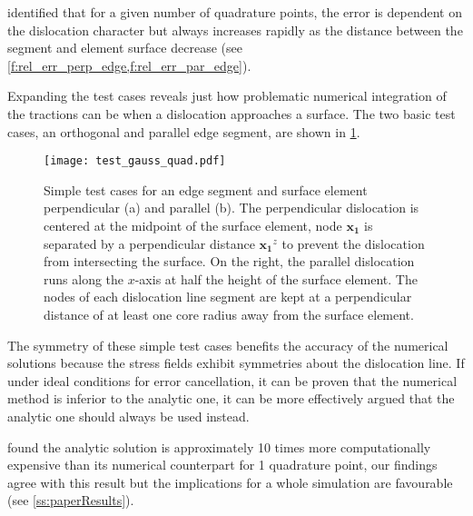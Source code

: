 \citet{analytic_tractions} identified that for a given number of quadrature points, the error is dependent on the dislocation character but always increases rapidly as the distance between the segment and element surface decrease (see \cref{f:rel_err_perp_edge,f:rel_err_par_edge}).

Expanding the test cases reveals just how problematic numerical integration of the tractions can be when a dislocation approaches a surface. The two basic test cases, an orthogonal and parallel edge segment, are shown in \cref{f:gauss_quad_test}.
\begin{figure}
    \centering
    \texttt{[image: test\_gauss\_quad.pdf]}
    \caption[Test cases for comparing numeric v.s. analytic tractions using an edge dislocation near a surface.]{Simple test cases for an edge segment and surface element perpendicular (a) and parallel (b). The perpendicular dislocation is centered at the midpoint of the surface element, node $\mathbf{x_1}$ is separated by a perpendicular distance $\mathbf{x_1}^z$ to prevent the dislocation from intersecting the surface. On the right, the parallel dislocation runs along the $x$-axis at half the height of the surface element. The nodes of each dislocation line segment are kept at a perpendicular distance of at least one core radius away from the surface element.}
    \label{f:gauss_quad_test}
\end{figure}

The symmetry of these simple test cases benefits the accuracy of the numerical solutions because the stress fields exhibit symmetries about the dislocation line. If under ideal conditions for error cancellation, it can be proven that the numerical method is inferior to the analytic one, it can be more effectively argued that the analytic one should always be used instead.

\citet{analytic_tractions} found the analytic solution is approximately 10 times more computationally expensive than its numerical counterpart for 1 quadrature point, our findings agree with this result but the implications for a whole simulation are favourable (see \cref{ss:paperResults}).

